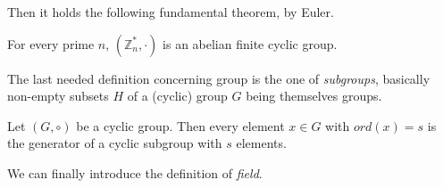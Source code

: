 \noindent
Then it holds the following fundamental theorem, by Euler.
\begin{mytheorem}
    For every prime $n$, $(\mathbb{Z}_n^{*},\cdot)$ is an abelian finite cyclic group.
\end{mytheorem}
\noindent
The last needed definition concerning group is the one of \textit{subgroups}, basically non-empty subsets $H$ of a (cyclic) group $G$ being themselves groups.
\begin{mytheorem}
    Let $(G,\circ)$ be a cyclic group. Then every element $x \in G$ with $ord(x)=s$ is the generator of a cyclic subgroup with $s$ elements.
\end{mytheorem}
\noindent
We can finally introduce the definition of \textit{field}.